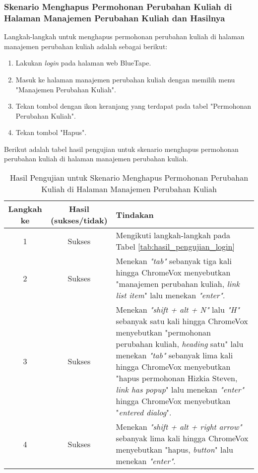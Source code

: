 \subsubsection{Skenario Menghapus Permohonan Perubahan Kuliah di Halaman Manajemen Perubahan Kuliah dan Hasilnya}
\label{subsubsec:skenario_menghapus_permohonan_perubahan_kuliah_di_halaman_manajemen_perubahan_kuliah}
Langkah-langkah untuk menghapus permohonan perubahan kuliah di halaman manajemen perubahan kuliah adalah sebagai berikut:

\begin{enumerate}
    \item Lakukan \textit{login} pada halaman web BlueTape.
    \item Masuk ke halaman manajemen perubahan kuliah dengan memilih menu "Manajemen Perubahan Kuliah".
    \item Tekan tombol dengan ikon keranjang yang terdapat pada tabel "Permohonan Perubahan Kuliah".
    \item Tekan tombol "Hapus".
\end{enumerate}

Berikut adalah tabel hasil pengujian untuk skenario menghapus permohonan perubahan kuliah di halaman manajemen perubahan kuliah.

\begin{table}[H]
    \centering 
    \caption{Hasil Pengujian untuk Skenario Menghapus Permohonan Perubahan Kuliah di Halaman Manajemen Perubahan Kuliah}
    \label{tab:hasil_pengujian_menghapus_permohonan_perubahan_kuliah_di_halaman_manajemen_perubahan_kuliah}
    \begin{tabular}{|c|c|p{10cm}|}
        \toprule
        Langkah ke & Hasil (sukses/tidak) & Tindakan \\

        \midrule
        1 & Sukses & Mengikuti langkah-langkah pada Tabel \ref{tab:hasil_pengujian_login} \\
        2 & Sukses & Menekan \textit{"tab"} sebanyak tiga kali hingga ChromeVox menyebutkan "manajemen perubahan kuliah, \textit{link list item}" lalu menekan \textit{"enter"}. \\
        3 & Sukses & Menekan \textit{"shift + alt + N"} lalu \textit{"H"} sebanyak satu kali hingga ChromeVox menyebutkan "permohonan perubahan kuliah, \textit{heading} satu" lalu menekan \textit{"tab"} sebanyak lima kali hingga ChromeVox menyebutkan "hapus permohonan Hizkia Steven, \textit{link has popup}" lalu menekan \textit{"enter"} hingga ChromeVox menyebutkan "\textit{entered dialog}". \\
        4 & Sukses & Menekan \textit{"shift + alt + right arrow"} sebanyak lima kali hingga ChromeVox menyebutkan "hapus, \textit{button}" lalu menekan \textit{"enter"}. \\ 

        \bottomrule

    \end{tabular}
\end{table}

